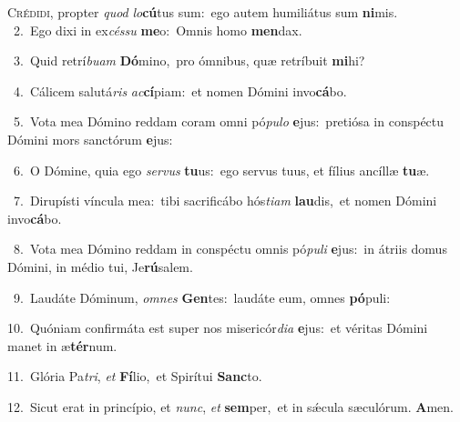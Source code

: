 \lettrine{\initial\textcolor{\initialcolor}{C}}{rédidi,} propter \textit{quod} \textit{lo}\-\textbf{cú}tus sum:~\star ego autem humiliátus sum \textbf{ni}\-mis.\\
{\numbfont\textcolor{\numbcolor}{~2.}}~Ego dixi in ex\-\textit{cés}\-\textit{su} \textbf{me}\-o:~\star Omnis homo \textbf{men}\-dax.\par
{\numbfont\textcolor{\numbcolor}{~3.}}~Quid retrí\-\textit{bu}\-\textit{am} \textbf{Dó}\-mino,~\star pro ómnibus, quæ retríbuit \textbf{mi}\-hi?\par
{\numbfont\textcolor{\numbcolor}{~4.}}~Cálicem salutá\textit{ris} \textit{ac}\-\textbf{cí}piam:~\star et nomen Dómini invo\-\textbf{cá}\-bo.\par
{\numbfont\textcolor{\numbcolor}{~5.}}~Vota mea Dómino reddam coram omni pó\-\textit{pu}\-\textit{lo} \textbf{e}\-jus:~\star pretiósa in conspéctu Dómini mors sanctórum \textbf{e}\-jus:\par
{\numbfont\textcolor{\numbcolor}{~6.}}~O Dómine, quia ego \textit{ser}\-\textit{vus} \textbf{tu}\-us:~\star ego servus tuus, et fílius ancíllæ \textbf{tu}\-æ.\par
{\numbfont\textcolor{\numbcolor}{~7.}}~Dirupísti víncula mea:~\dagger tibi sacrificábo hós\-\textit{ti}\-\textit{am} \textbf{lau}\-dis,~\star et nomen Dómini invo\-\textbf{cá}\-bo.\par
{\numbfont\textcolor{\numbcolor}{~8.}}~Vota mea Dómino reddam in conspéctu omnis pó\-\textit{pu}\-\textit{li} \textbf{e}\-jus:~\star in átriis domus Dómini, in médio tui, Je\-\textbf{rú}\-salem.\par
{\numbfont\textcolor{\numbcolor}{~9.}}~Laudáte Dóminum, \textit{om}\-\textit{nes} \textbf{Gen}\-tes:~\star laudáte eum, omnes \textbf{pó}\-puli:\par
{\numbfont\textcolor{\numbcolor}{10.}}~Quóniam confirmáta est super nos misericór\-\textit{di}\-\textit{a} \textbf{e}\-jus:~\star et véritas Dómini manet in æ\-\textbf{tér}\-num.\par
{\numbfont\textcolor{\numbcolor}{11.}}~Glória Pa\-\textit{tri}\-, \textit{et} \textbf{Fí}\-lio,~\star et Spirítui \textbf{Sanc}\-to.\par
{\numbfont\textcolor{\numbcolor}{12.}}~Sicut erat in princípio, et \textit{nunc}\-, \textit{et} \textbf{sem}\-per,~\star et in sǽcula sæculórum. \textbf{A}\-men.\par
